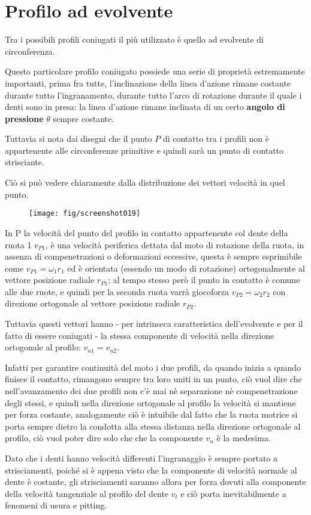 \documentclass[a4paper, 15pt]{article}
\begin{document}
\section{Profilo ad evolvente}
\begin{adjustwidth}{2in}{}	
	Tra i possibili profili coniugati il più utilizzato è quello ad evolvente di circonferenza.
	
	Questo particolare profilo coniugato possiede una serie di proprietà estremamente importanti, prima fra tutte, l'inclinazione della linea d'azione rimane costante durante tutto l'ingranamento, durante tutto l'arco di rotazione durante il quale i denti sono in presa: la linea d'azione rimane inclinata di un certo \textbf{angolo di pressione} $\theta$ sempre costante. \newline
	
	Tuttavia si nota dai disegni che il punto $P$ di contatto tra i profili non è appartenente alle circonferenze primitive e quindi sarà un punto di contatto strisciante. 
	
	Ciò si può vedere chiaramente dalla distribuzione dei vettori velocità in quel punto.
	\begin{figure}[H]
		\centering
		\texttt{[image: fig/screenshot019]}
		\label{fig:screenshot019}
	\end{figure}
	In P la velocità del punto del profilo in contatto appartenente col dente della ruota 1 $v_{P1}$, è una velocità periferica dettata dal moto di rotazione della ruota, in assenza di compenetrazioni o deformazioni eccessive, questa è sempre esprimibile come $v_{P1} = \omega_1r_1$ ed è orientata (essendo un modo di rotazione) ortogonalmente al vettore posizione radiale $r_{P1}$; al tempo stesso però il punto in contatto è comune alle due ruote, e quindi per la seconda ruota varrà giocoforza $v_{P2} = \omega_2r_2$ con direzione ortogonale al vettore posizione radiale $r_{P2}$. \newline
	
	Tuttavia questi vettori hanno - per intrinseca caratteristica dell'evolvente e per il fatto di essere coniugati - la stessa componente di velocità nella direzione ortogonale al profilo: $v_{n1} = v_{n2}$.
	
	Infatti per garantire continuità del moto i due profili, da quando inizia a quando finisce il contatto, rimangono sempre tra loro uniti in un punto, ciò vuol dire che nell'avanzamento dei due profili non c'è mai nè separazione nè compenetrazione degli stessi, e quindi nella direzione ortogonale al profilo la velocità si mantiene per forza costante, analogamente ciò è intuibile dal fatto che la ruota motrice si porta sempre dietro la condotta alla stessa distanza nella direzione ortogonale al profilo, ciò vuol poter dire solo che che la componente $v_n$ è la medesima.\newline
	
	Dato che i denti hanno velocità differenti l'ingranaggio è sempre portato a strisciamenti, poiché si è appena visto che la componente di velocità normale al dente è costante, gli strisciamenti saranno allora per forza dovuti alla componente della velocità tangenziale al profilo del dente $v_t$ e ciò porta inevitabilmente a fenomeni di usura e pitting.
\end{adjustwidth}
\newpage
\end{document}
